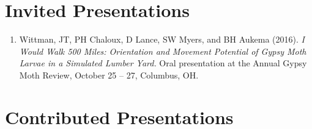 \documentclass[11pt, a4paper]{awesome-cv}
\providecommand{\tightlist}{%
	\setlength{\itemsep}{0pt}\setlength{\parskip}{0pt}}
\newcounter{papers}
\begin{document}
\newrefcontext[sorting=none]\setcounter{papers}{0}\pagebreak[3]
\printbibliography[category=bib-bibs/publications.bib-3813863,heading=none]\setcounter{papers}{0}

\nocite{Short,
Hallinen,
Stivers2019,
Wittman2018,
Wittman2019,
Wittman2017,
Wittman2013}

\hypertarget{invited-presentations}{%
\section{Invited Presentations}\label{invited-presentations}}

\begin{enumerate}
\def\labelenumi{\arabic{enumi}.}
\tightlist
\item
  Wittman, JT, PH Chaloux, D Lance, SW Myers, and BH Aukema (2016). \emph{I Would Walk 500 Miles: Orientation and Movement Potential of Gypsy Moth Larvae in a Simulated Lumber Yard.} Oral presentation at the Annual Gypsy Moth Review, October 25 -- 27, Columbus, OH.
\end{enumerate}

\hypertarget{contributed-presentations}{%
\section{Contributed Presentations}\label{contributed-presentations}}
\end{document}

